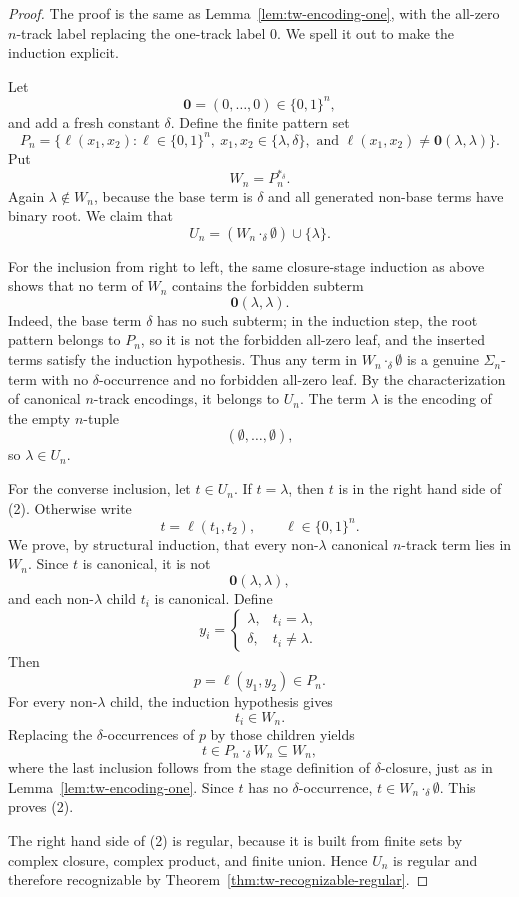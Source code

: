 \documentclass[11pt]{article}
\theoremstyle{definition}
\begin{document}
\begin{proof}
The proof is the same as Lemma~\ref{lem:tw-encoding-one}, with the all-zero
\(n\)-track label replacing the one-track label \(0\).  We spell it out to make
the induction explicit.

Let
\[
  \mathbf 0=(0,\ldots,0)\in\{0,1\}^n,
\]
and add a fresh constant \(\delta\).  Define the finite pattern set
\[
  P_n=
  \{\ell(x_1,x_2):
      \ell\in\{0,1\}^n,\ x_1,x_2\in\{\lambda,\delta\},
      \text{ and } \ell(x_1,x_2)\ne
        \mathbf 0(\lambda,\lambda)\}.
\]
Put
\[
  W_n=P_n^{*_\delta}.
\]
Again \(\lambda\notin W_n\), because the base term is \(\delta\) and all
generated non-base terms have binary root.
We claim that
\[
  U_n=(W_n\cdot_\delta\emptyset)\cup\{\lambda\}.       \tag{2}
\]

For the inclusion from right to left, the same closure-stage induction as above
shows that no term of \(W_n\) contains the forbidden subterm
\[
  \mathbf 0(\lambda,\lambda).
\]
Indeed, the base term \(\delta\) has no such subterm; in the induction step, the
root pattern belongs to \(P_n\), so it is not the forbidden all-zero leaf, and
the inserted terms satisfy the induction hypothesis.  Thus any term in
\(W_n\cdot_\delta\emptyset\) is a genuine \(\Sigma_n\)-term with no
\(\delta\)-occurrence and no forbidden all-zero leaf.  By the characterization of
canonical \(n\)-track encodings, it belongs to \(U_n\).  The term \(\lambda\) is
the encoding of the empty \(n\)-tuple
\[
  (\emptyset,\ldots,\emptyset),
\]
so \(\lambda\in U_n\).

For the converse inclusion, let \(t\in U_n\).  If \(t=\lambda\), then \(t\) is
in the right hand side of (2).  Otherwise write
\[
  t=\ell(t_1,t_2),\qquad \ell\in\{0,1\}^n.
\]
We prove, by structural induction, that every non-\(\lambda\) canonical
\(n\)-track term lies in \(W_n\).  Since \(t\) is canonical, it is not
\[
  \mathbf 0(\lambda,\lambda),
\]
and each non-\(\lambda\) child \(t_i\) is canonical.  Define
\[
  y_i=
  \begin{cases}
    \lambda, & t_i=\lambda,\\
    \delta, & t_i\ne\lambda.
  \end{cases}
\]
Then
\[
  p=\ell(y_1,y_2)\in P_n.
\]
For every non-\(\lambda\) child, the induction hypothesis gives
\[
  t_i\in W_n.
\]
Replacing the \(\delta\)-occurrences of \(p\) by those children yields
\[
  t\in P_n\cdot_\delta W_n\subseteq W_n,
\]
where the last inclusion follows from the stage definition of
\(\delta\)-closure, just as in Lemma~\ref{lem:tw-encoding-one}.  Since \(t\) has
no \(\delta\)-occurrence, \(t\in W_n\cdot_\delta\emptyset\).  This proves (2).

The right hand side of (2) is regular, because it is built from finite sets by
complex closure, complex product, and finite union.  Hence \(U_n\) is regular
and therefore recognizable by Theorem~\ref{thm:tw-recognizable-regular}.
\end{proof}
\end{document}
